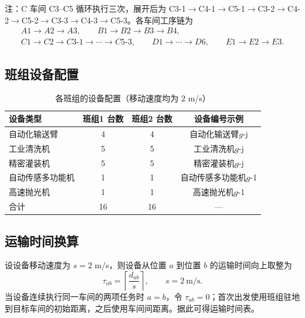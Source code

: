 \documentclass[12pt,a4paper]{article}
\begin{document}
注：C 车间 C3--C5 循环执行三次，展开后为 C3-1$\to$C4-1$\to$C5-1$\to$C3-2$\to$C4-2$\to$C5-2$\to$C3-3$\to$C4-3$\to$C5-3。各车间工序链为
\[
\begin{gathered}
A1\to A2\to A3,\qquad B1\to B2\to B3\to B4,\\
C1\to C2\to C3\text{-}1\to\cdots\to C5\text{-}3,\qquad
D1\to\cdots\to D6,\qquad E1\to E2\to E3 .
\end{gathered}
\]

\subsection{班组设备配置}

\begin{table}[H]
\centering
\caption{各班组的设备配置（移动速度均为 $2$ m/s）}
\small
\begin{tabular}{lccc}
\toprule
设备类型 & 班组1 台数 & 班组2 台数 & 设备编号示例 \\
\midrule
自动化输送臂 & 4 & 4 & 自动化输送臂$g$-j \\
工业清洗机 & 5 & 5 & 工业清洗机$g$-j \\
精密灌装机 & 5 & 5 & 精密灌装机$g$-j \\
自动传感多功能机 & 1 & 1 & 自动传感多功能机$g$-1 \\
高速抛光机 & 1 & 1 & 高速抛光机$g$-1 \\
\midrule
合计 & 16 & 16 & — \\
\bottomrule
\end{tabular}
\end{table}

\subsection{运输时间换算}

设设备移动速度为 $s=2$ m/s，则设备从位置 $a$ 到位置 $b$ 的运输时间向上取整为
\begin{equation}
\tau_{ab}=\left\lceil \frac{d_{ab}}{s}\right\rceil,\qquad s=2\ \text{m/s}.
\end{equation}
当设备连续执行同一车间的两项任务时 $a=b$，令 $\tau_{ab}=0$；首次出发使用班组驻地到目标车间的初始距离，之后使用车间间距离。据此可得运输时间表。
\end{document}
